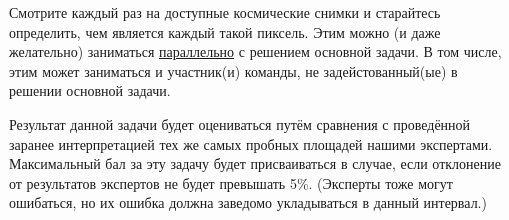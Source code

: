 Смотрите каждый раз на доступные космические снимки и старайтесь определить, чем является каждый такой пиксель. Этим можно (и даже желательно) заниматься \underline{параллельно} с решением основной задачи. В том числе, этим может заниматься и участник(и) команды, не задейстованный(ые) в решении основной задачи.

Результат данной задачи будет оцениваться путём сравнения с проведённой заранее интерпретацией тех же самых пробных площадей нашими экспертами. Максимальный бал за эту задачу будет присваиваться в случае, если отклонение от результатов экспертов не будет превышать 5\%. (Эксперты тоже могут ошибаться, но их ошибка должна заведомо укладываться в данный интервал.)